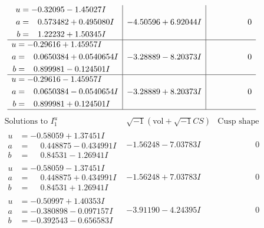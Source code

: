 \documentclass[1p]{elsarticle_modified}
\theoremstyle{definition}
\newcommand{\I}{\sqrt{-1}}
\begin{document}
$$\begin{array}{c|c|c}
\begin{aligned}
u &= -0.32095 - 1.45027 I \\
a &= \phantom{-}0.573482 + 0.495080 I \\
b &= \phantom{-}1.22232 + 1.50345 I\end{aligned}
 & -4.50596 + 6.92044 I & \phantom{-0.000000 } 0 \\ \hline\begin{aligned}
u &= -0.29616 + 1.45957 I \\
a &= \phantom{-}0.0650384 + 0.0540654 I \\
b &= \phantom{-}0.899981 - 0.124501 I\end{aligned}
 & -3.28889 - 8.20373 I & \phantom{-0.000000 } 0 \\ \hline\begin{aligned}
u &= -0.29616 - 1.45957 I \\
a &= \phantom{-}0.0650384 - 0.0540654 I \\
b &= \phantom{-}0.899981 + 0.124501 I\end{aligned}
 & -3.28889 + 8.20373 I & \phantom{-0.000000 } 0\\
 \hline 
 \end{array}$$\newpage$$\begin{array}{c|c|c}  
\text{Solutions to }I^u_{1}& \I (\text{vol} + \sqrt{-1}CS) & \text{Cusp shape}\\
 \hline 
\begin{aligned}
u &= -0.58059 + 1.37451 I \\
a &= \phantom{-}0.448875 - 0.434991 I \\
b &= \phantom{-}0.84531 - 1.26941 I\end{aligned}
 & -1.56248 - 7.03783 I & \phantom{-0.000000 } 0 \\ \hline\begin{aligned}
u &= -0.58059 - 1.37451 I \\
a &= \phantom{-}0.448875 + 0.434991 I \\
b &= \phantom{-}0.84531 + 1.26941 I\end{aligned}
 & -1.56248 + 7.03783 I & \phantom{-0.000000 } 0 \\ \hline\begin{aligned}
u &= -0.50997 + 1.40353 I \\
a &= -0.380898 - 0.097157 I \\
b &= -0.392543 - 0.656583 I\end{aligned}
 & -3.91190 - 4.24395 I & \phantom{-0.000000 } 0 \\ \hline\begin{aligned}

\end{aligned}
\end{array}$$
\end{document}
